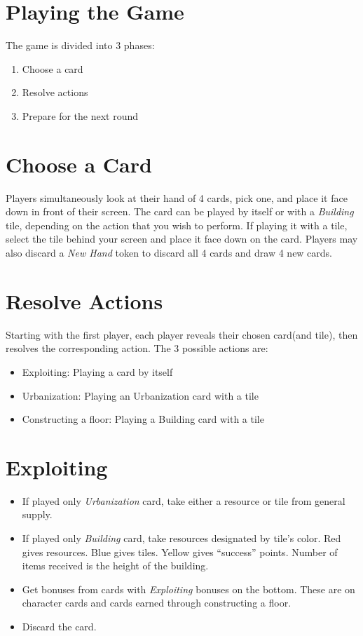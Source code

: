 \documentclass[10pt]{article}
\newenvironment{enumerateCustom}
{\begin{enumerate}
  \setlength{\itemsep}{1pt}
  \setlength{\parskip}{0pt}
  \setlength{\parsep}{0pt}}
{\end{enumerate}}
\newenvironment{itemizeCustom}
{\begin{itemize}
  \setlength{\itemsep}{1pt}
  \setlength{\parskip}{0pt}
  \setlength{\parsep}{0pt}}
{\end{itemize}}
\begin{document}
\begin{mdframed}[style = customFrame]
\begin{multicols*}{2}
\section*{Playing the Game}
The game is divided into 3 phases:
\begin{enumerateCustom}
	\item Choose a card
	\item Resolve actions
	\item Prepare for the next round
\end{enumerateCustom}

\section*{Choose a Card}
Players simultaneously look at their hand of 4 cards, pick one, and place it face down in front of their screen. The card can be played by itself or with a \emph{Building} tile, depending on the action that you wish to perform. If playing it with a tile, select the tile behind your screen and place it face down on the card. Players may also discard a \emph{New Hand} token to discard all 4 cards and draw 4 new cards.

\section*{Resolve Actions}
Starting with the first player, each player reveals their chosen card(and tile), then resolves the corresponding action. The 3 possible actions are:
\begin{itemizeCustom}
	\item Exploiting: Playing a card by itself
	\item Urbanization: Playing an Urbanization card with a tile
	\item Constructing a floor: Playing a Building card with a tile
\end{itemizeCustom}

\section*{Exploiting}
\begin{itemizeCustom}
	\item If played only \emph{Urbanization} card, take either a resource or tile from general supply.
	\item If played only \emph{Building} card, take resources designated by tile's color. Red gives resources. Blue gives tiles. Yellow gives ``success'' points. Number of items received is the height of the building.
	\item Get bonuses from cards with \emph{Exploiting} bonuses on the bottom. These are on character cards and cards earned through constructing a floor.
	\item Discard the card.
\end{itemizeCustom}


\end{multicols*}
\end{mdframed}
\end{document}
